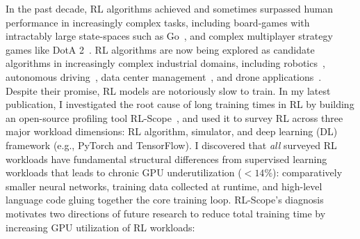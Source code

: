 \documentclass[letterpaper,11pt]{article}
\begin{document}
In the past decade, RL algorithms achieved and sometimes surpassed human performance in increasingly complex tasks, 
including board-games with intractably large state-spaces such as Go~\cite{silver2017mastering}, and complex multiplayer strategy games like DotA 2~\cite{OpenAI_dota}.
RL algorithms are now being explored as candidate algorithms in increasingly complex industrial domains, including robotics~\cite{brockman2016openai,kober2013reinforcement}, autonomous driving~\cite{dosovitskiy2017carla,sallab2016end}, data center management~\cite{datacenterRL}, and drone applications~\cite{krishnan2019air}.
Despite their promise, RL models are notoriously slow to train.
In my latest publication, I investigated the root cause of long training times in RL by building an open-source profiling tool RL-Scope~\cite{gleeson2021rlscope}, and used it to survey RL across three major workload dimensions: RL algorithm, simulator, and deep learning (DL) framework (e.g., PyTorch and TensorFlow).
I discovered that \emph{all} surveyed RL workloads have fundamental structural differences from supervised learning workloads that leads to chronic GPU underutilization ($< 14\%$): comparatively smaller neural networks, training data collected at runtime, and high-level language code gluing together the core training loop.  
RL-Scope's diagnosis motivates two directions of future research to reduce total training time by increasing GPU utilization of RL workloads:
\end{document}
